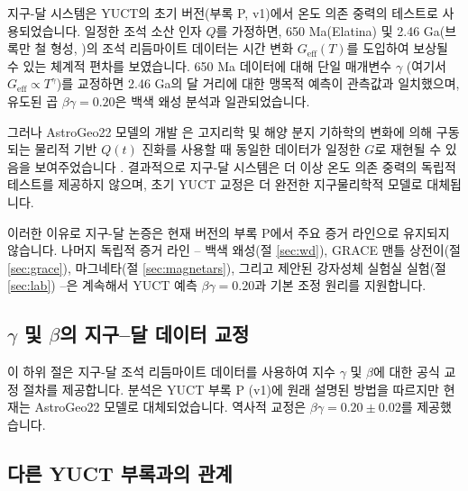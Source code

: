 \documentclass[11pt,a4paper]{article}
\begin{document}
	지구-달 시스템은 YUCT의 초기 버전(부록 P, v1)에서 온도 의존 중력의 테스트로 사용되었습니다. 일정한 조석 소산 인자 $Q$를 가정하면, 650 Ma(Elatina) 및 2.46 Ga(브록만 철 형성, \cite{Lantink2022})의 조석 리듬마이트 데이터는 시간 변화 $G_{\mathrm{eff}}(T)$를 도입하여 보상될 수 있는 체계적 편차를 보였습니다. 650 Ma 데이터에 대해 단일 매개변수 $\gamma$ (여기서 $G_{\mathrm{eff}}\propto T^{\gamma}$)를 교정하면 2.46 Ga의 달 거리에 대한 맹목적 예측이 관측값과 일치했으며, 유도된 곱 $\beta\gamma = 0.20$은 백색 왜성 분석과 일관되었습니다.
	
	그러나 AstroGeo22 모델의 개발 \cite{Farhat2022}은 고지리학 및 해양 분지 기하학의 변화에 의해 구동되는 물리적 기반 $Q(t)$ 진화를 사용할 때 동일한 데이터가 일정한 $G$로 재현될 수 있음을 보여주었습니다 \cite{Zeeden2023}. 결과적으로 지구-달 시스템은 더 이상 온도 의존 중력의 독립적 테스트를 제공하지 않으며, 초기 YUCT 교정은 더 완전한 지구물리학적 모델로 대체됩니다.
	
	이러한 이유로 지구-달 논증은 현재 버전의 부록 P에서 주요 증거 라인으로 유지되지 않습니다. 나머지 독립적 증거 라인 – 백색 왜성(절 \ref{sec:wd}), GRACE 맨틀 상전이(절 \ref{sec:grace}), 마그네타(절 \ref{sec:magnetars}), 그리고 제안된 강자성체 실험실 실험(절 \ref{sec:lab}) –은 계속해서 YUCT 예측 $\beta\gamma = 0.20$과 기본 조정 원리를 지원합니다.
	
	\subsection{$\gamma$ 및 $\beta$의 지구–달 데이터 교정}\label{subsec:earth-moon-calibration}
	이 하위 절은 지구-달 조석 리듬마이트 데이터를 사용하여 지수 $\gamma$ 및 $\beta$에 대한 공식 교정 절차를 제공합니다. 분석은 YUCT 부록 P (v1)에 원래 설명된 방법을 따르지만 현재는 AstroGeo22 모델로 대체되었습니다. 역사적 교정은 $\beta\gamma = 0.20 \pm 0.02$를 제공했습니다.
	
	\subsection{다른 YUCT 부록과의 관계}
	
\end{document}

